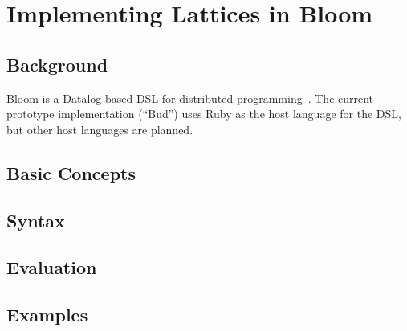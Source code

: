 \section{Implementing Lattices in Bloom}

\subsection{Background}
Bloom is a Datalog-based DSL for distributed programming~\cite{Alvaro2011,bloom}.
The current prototype implementation (``Bud'') uses Ruby as the host language
for the DSL, but other host languages are planned.

\subsection{Basic Concepts}

\subsection{Syntax}

\subsection{Evaluation}

\subsection{Examples}
